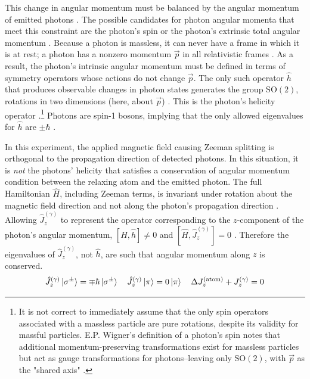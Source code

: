 \documentclass[11pt]{article}
\begin{document}
This change in angular momentum must be balanced by the angular momentum of emitted photons \cite{harris}. The possible candidates for photon angular momenta that meet this constraint are the photon's spin or the photon's extrinsic total angular momentum \cite{harris}. Because a photon is massless, it can never have a frame in which it is at rest; a photon has a nonzero momentum $\vec p$ in all relativistic frames \cite{wigner}. As a result, the photon's intrinsic angular momentum must be defined in terms of symmetry operators whose actions do not change $\vec p$. The only such operator $\hat h$ that produces observable changes in photon states generates the group $\text{SO}(2)$, rotations in two dimensions (here, about $\vec p$) \cite{wigner, tung}. This is the photon's helicity operator \cite{wigner}.\footnote{It is not correct to immediately assume that the only spin operators associated with a massless particle are pure rotations, despite its validity for massful particles. E.P. Wigner's definition of a photon's spin notes that additional momentum-preserving transformations exist for massless particles but act as gauge transformations for photons--leaving only $\text{SO}(2)$, with $\vec p$ as the "shared axis" \cite{wigner}.} Photons are spin-1 bosons, implying that the only allowed eigenvalues for $\hat{h}$ are $\pm \hbar$ \cite{harris, qmech,griffiths_qm}.

In this experiment, the applied magnetic field causing Zeeman splitting is orthogonal to the propagation direction of detected photons. In this situation, it is \textit{not} the photons' helicity that satisfies a conservation of angular momentum condition between the relaxing atom and the emitted photon. The full Hamiltonian $\hat H$, including Zeeman terms, is invariant under rotation about the magnetic field direction and not along the photon's propagation direction \cite{harris, qmech}. Allowing $\hat J_z^{(\gamma)}$ to represent the operator corresponding to the $z$-component of the photon's angular momentum, $[\hat H, \hat h] \neq 0$ and $[\hat H, \hat J_z^{(\gamma)}] = 0$ \cite{qmech,griffiths_qm}. Therefore the eigenvalues of $\hat J_z^{(\gamma)}$, not $\hat h$, are such that angular momentum along $z$ is conserved. 
\begin{equation}
    \hat J_z^{(\gamma)} \ket{\sigma^{\pm}} = \mp \hbar \ket{\sigma^{\pm}} 
    \quad 
    \hat J_z^{(\gamma)} \ket{\pi} = 0 \ket{\pi}
    \quad
    \Delta J_z^{(\text{atom})} + 
    J_z^{(\gamma)} = 0
\end{equation}
\end{document}

